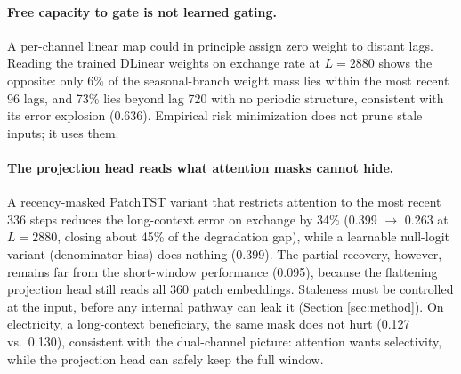 \paragraph{Free capacity to gate is not learned gating.}
A per-channel linear map could in principle assign zero weight to distant lags. Reading the trained DLinear weights on exchange rate at $L{=}2880$ shows the opposite: only 6\% of the seasonal-branch weight mass lies within the most recent 96 lags, and 73\% lies beyond lag 720 with no periodic structure, consistent with its error explosion (0.636). Empirical risk minimization does not prune stale inputs; it uses them.

\paragraph{The projection head reads what attention masks cannot hide.}
A recency-masked PatchTST variant that restricts attention to the most recent 336 steps reduces the long-context error on exchange by 34\% (0.399 $\to$ 0.263 at $L{=}2880$, closing about 45\% of the degradation gap), while a learnable null-logit variant (denominator bias) does nothing (0.399). The partial recovery, however, remains far from the short-window performance (0.095), because the flattening projection head still reads all 360 patch embeddings. Staleness must be controlled at the input, before any internal pathway can leak it (Section \ref{sec:method}). On electricity, a long-context beneficiary, the same mask does not hurt (0.127 vs.\ 0.130), consistent with the dual-channel picture: attention wants selectivity, while the projection head can safely keep the full window.
